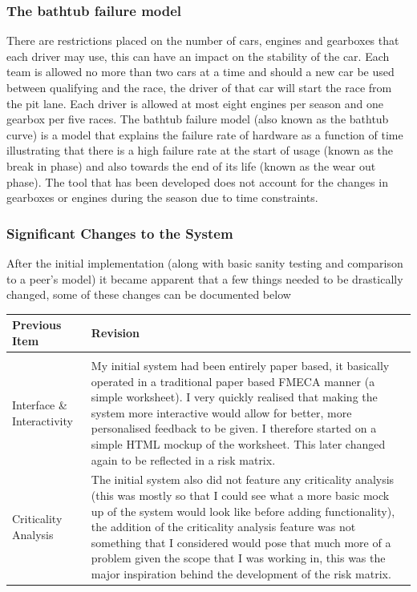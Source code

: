 \documentclass[12pt]{article} %
\begin{document}
\subsubsection{The bathtub failure model}
There are restrictions placed on the number of cars, engines and gearboxes that each driver may use, this can have an impact on the stability of the car. Each team is allowed no more than two cars at a time and should a new car be used between qualifying and the race, the driver of that car will start the race from the pit lane. Each driver is allowed at most eight engines per season and one gearbox per five races. The bathtub failure model (also known as the bathtub curve) is a model that explains the failure rate of hardware as a function of time illustrating that there is a high failure rate at the start of usage (known as the break in phase) and also towards the end of its life (known as the wear out phase). The tool that has been developed does not account for the changes in gearboxes or engines during the season due to time constraints.

\subsubsection{Significant Changes to the System}

After the initial implementation (along with basic sanity testing and comparison to a peer's model) it became apparent that a few things needed to be drastically changed, some of these changes can be documented below
\begin{center}
\begin{tabular}{p{3cm} p{10cm}}
Previous Item & Revision \\
\hline \\
Interface \& Interactivity & My initial system had been entirely paper based, it basically operated in a traditional paper based FMECA manner (a simple worksheet). I very quickly realised that making the system more interactive would allow for better, more personalised feedback to be given. I therefore started on a simple HTML mockup of the worksheet. This later changed again to be reflected in a risk matrix. \\
Criticality Analysis & The initial system also did not feature any criticality analysis (this was mostly so that I could see what a more basic mock up of the system would look like before adding functionality), the addition of the criticality analysis feature was not something that I considered would pose that much more of a problem given the scope that I was working in, this was the major inspiration behind the development of the risk matrix. \\
\end{tabular}
\end{center}
\end{document}
